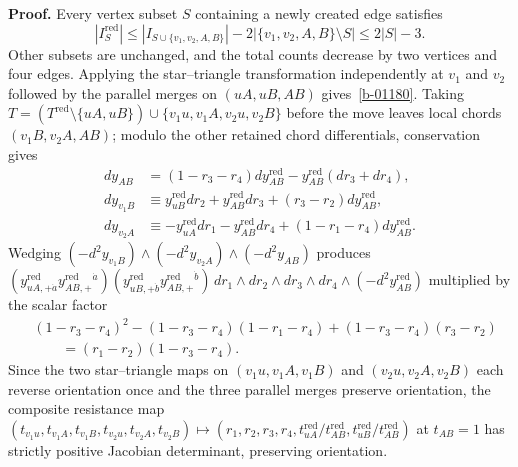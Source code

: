 \documentclass[11pt]{article}
\numberwithin{equation}{section}
\numberwithin{figure}{section}
\numberwithin{table}{section}
\begin{document}
\begin{proofbox}
\textbf{Proof.} Every vertex subset $S$ containing a newly created edge satisfies
\begin{equation}\label{eq-paired-laman-count}
|I_S^{\mathrm{red}}|
\le |I_{S\cup\{v_1,v_2,A,B\}}|-2|\{v_1,v_2,A,B\}\setminus S|
\le2|S|-3.
\end{equation}
Other subsets are unchanged, and the total counts decrease by two vertices and four edges.
Applying the star--triangle transformation independently at $v_1$ and $v_2$ followed by the parallel merges on $(uA,uB,AB)$ gives~\eqref{b-01180}.
Taking $T=(T^{\mathrm{red}}\setminus\{uA,uB\})\cup\{v_1u,v_1A,v_2u,v_2B\}$ before the move leaves local chords $(v_1B,v_2A,AB)$; modulo the other retained chord differentials, conservation gives
\begin{equation}
\begin{aligned}
dy_{AB}
&=(1-r_3-r_4)dy_{AB}^{\mathrm{red}}
-y_{AB}^{\mathrm{red}}(dr_3+dr_4),\\
dy_{v_1B}
&\equiv y_{uB}^{\mathrm{red}}dr_2+y_{AB}^{\mathrm{red}}dr_3
+(r_3-r_2)dy_{AB}^{\mathrm{red}},\\
dy_{v_2A}
&\equiv-y_{uA}^{\mathrm{red}}dr_1-y_{AB}^{\mathrm{red}}dr_4
+(1-r_1-r_4)dy_{AB}^{\mathrm{red}}.
\end{aligned}
\end{equation}
Wedging $(-d^2y_{v_1B})\wedge(-d^2y_{v_2A})\wedge(-d^2y_{AB})$ produces $(y_{uA,+\dot a}^{\mathrm{red}}y_{AB,+}^{\mathrm{red}}{}^{\dot a})(y_{uB,+\dot b}^{\mathrm{red}}y_{AB,+}^{\mathrm{red}}{}^{\dot b})\,dr_1\wedge dr_2\wedge dr_3\wedge dr_4\wedge(-d^2y_{AB}^{\mathrm{red}})$ multiplied by the scalar factor
\begin{equation}
\begin{aligned}
&(1-r_3-r_4)^2
-(1-r_3-r_4)(1-r_1-r_4)
+(1-r_3-r_4)(r_3-r_2)\\
&\qquad=(r_1-r_2)(1-r_3-r_4).
\end{aligned}
\end{equation}
Since the two star--triangle maps on $(v_1u,v_1A,v_1B)$ and $(v_2u,v_2A,v_2B)$ each reverse orientation once and the three parallel merges preserve orientation, the composite resistance map $(t_{v_1u},t_{v_1A},t_{v_1B},t_{v_2u},t_{v_2A},t_{v_2B})\mapsto(r_1,r_2,r_3,r_4,t_{uA}^{\mathrm{red}}/t_{AB}^{\mathrm{red}},t_{uB}^{\mathrm{red}}/t_{AB}^{\mathrm{red}})$ at $t_{AB}=1$ has strictly positive Jacobian determinant, preserving orientation.~\hfill\qedsymbol
\end{proofbox}
\end{document}
